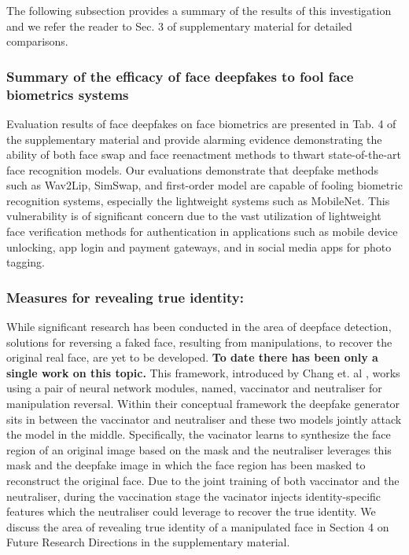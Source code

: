 The following subsection provides a summary of the results of this investigation and we refer the reader to Sec. 3 of supplementary material for detailed comparisons.


\subsubsection{Summary of the efficacy of face deepfakes to fool face biometrics systems}
Evaluation results of face deepfakes on face biometrics are presented in Tab. 4 of the supplementary material and provide alarming evidence demonstrating the ability of both face swap and face reenactment methods to thwart state-of-the-art face recognition models. Our evaluations demonstrate that deepfake methods such as Wav2Lip, SimSwap, and first-order model are capable of fooling biometric recognition systems, especially the lightweight systems such as MobileNet. This vulnerability is of significant concern due to the vast utilization of lightweight face verification methods for authentication in applications such as mobile device unlocking, app login and payment gateways, and in social media apps for photo tagging.


\subsubsection{Measures for revealing true identity: } While significant research has been conducted in the area of deepface detection, solutions for reversing a faked face, resulting from manipulations, to recover the original real face,  are yet to be developed. \textbf{To date there has been only a single work on this topic.} This framework, introduced by Chang et. al \cite{chang2023cyber}, works using a pair of neural network modules, named, vaccinator and neutraliser for manipulation reversal. Within their conceptual framework the deepfake generator sits in between the vaccinator and neutraliser and these two models jointly attack the model in the middle. Specifically, the vacinator learns to synthesize the face region of an original image based on the mask and the neutraliser leverages this mask and the deepfake image in which the face region has been masked to reconstruct the original face. Due to the joint training of both vaccinator and the neutraliser, during the vaccination stage the vacinator injects identity-specific features which the neutraliser could leverage to recover the true identity. We discuss the area of revealing true identity of a manipulated face in Section 4 on Future Research Directions in the supplementary material.